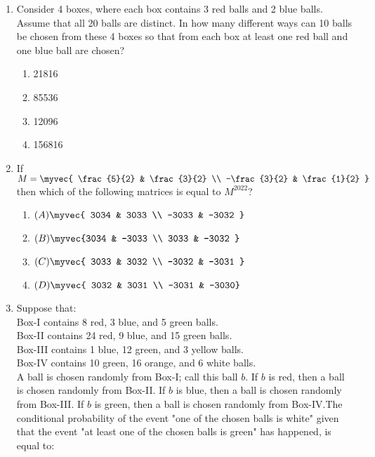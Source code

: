 \documentclass{article}
\begin{document}
\begin{enumerate}
    \item Consider 4 boxes, where each box contains 3 red balls and 2 blue balls. Assume that all 20 balls are distinct. In how many different ways can 10 balls be chosen from these 4 boxes so that from each box at least one red ball and one blue ball are chosen?

    \begin{enumerate}
        \item 21816
        \item 85536
        \item 12096
        \item 156816
    \end{enumerate}


 \item If 
$
M = \myvec{ 
\frac{5}{2} & \frac{3}{2} \\ 
-\frac{3}{2} & \frac{1}{2} 
}
$
then which of the following matrices is equal to \( M^{2022} \)?
\begin{enumerate}
\item $(A) \myvec{ 3034 & 3033 \\ -3033 & -3032 }$
\item $(B) \myvec{3034 & -3033 \\ 3033 & -3032 }$
\item $(C) \myvec{ 3033 & 3032 \\ -3032 & -3031 }$
\item $(D) \myvec{ 3032 & 3031 \\ -3031 & -3030}$
\end{enumerate}

\item Suppose that:\\
Box-I contains 8 red, 3 blue, and 5 green balls.\\
Box-II contains 24 red, 9 blue, and 15 green balls.\\
Box-III contains 1 blue, 12 green, and 3 yellow balls.\\
Box-IV contains 10 green, 16 orange, and 6 white balls.\\
A ball is chosen randomly from Box-I; call this ball \( b \). If \( b \) is red, then a ball is chosen randomly from Box-II. If \( b \) is blue, then a ball is chosen randomly from Box-III. If \( b \) is green, then a ball is chosen randomly from Box-IV.The conditional probability of the event "one of the chosen balls is white" given that the event "at least one of the chosen balls is green" has happened, is equal to:
\begin{enumerate}


\end{enumerate}
\end{enumerate}
\end{document}
